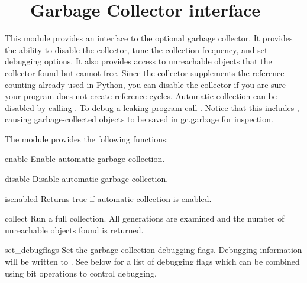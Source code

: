 \section{ ---
         Garbage Collector interface}


This module provides an interface to the optional garbage collector.  It
provides the ability to disable the collector, tune the collection
frequency, and set debugging options.  It also provides access to
unreachable objects that the collector found but cannot free.  Since the
collector supplements the reference counting already used in Python, you
can disable the collector if you are sure your program does not create
reference cycles.  Automatic collection can be disabled by calling
.  To debug a leaking program call
. Notice that this includes 
, causing garbage-collected objects to be
saved in gc.garbage for inspection.

The  module provides the following functions:

\begin{funcdesc}{enable}{}
Enable automatic garbage collection.
\end{funcdesc}

\begin{funcdesc}{disable}{}
Disable automatic garbage collection.
\end{funcdesc}

\begin{funcdesc}{isenabled}{}
Returns true if automatic collection is enabled.
\end{funcdesc}

\begin{funcdesc}{collect}{}
Run a full collection.  All generations are examined and the
number of unreachable objects found is returned.
\end{funcdesc}

\begin{funcdesc}{set_debug}{flags}
Set the garbage collection debugging flags.
Debugging information will be written to .  See below
for a list of debugging flags which can be combined using bit
operations to control debugging.
\end{funcdesc}

